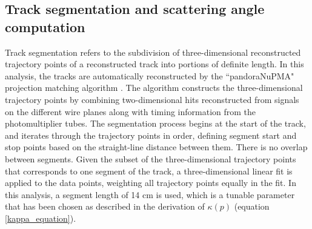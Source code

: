 \documentclass[a4paper,11pt]{article}
\begin{document}
\subsection{Track segmentation and scattering angle computation}\label{track_segmentation_and_scattering_angle_computation_section}

Track segmentation refers to the subdivision of three-dimensional reconstructed trajectory points of a reconstructed track into portions of definite length. In this analysis, the tracks are automatically reconstructed by the ``pandoraNuPMA" projection matching algorithm \cite{Marshall:2015rfa}. The algorithm constructs the three-dimensional trajectory points by combining two-dimensional hits reconstructed from signals on the different wire planes along with timing information from the photomultiplier tubes. The segmentation process begins at the start of the track, and iterates through the trajectory points in order, defining segment start and stop points based on the straight-line distance between them. There is no overlap between segments. Given the subset of the three-dimensional trajectory points that corresponds to one segment of the track, a three-dimensional linear fit is applied to the data points, weighting all trajectory points equally in the fit. In this analysis, a segment length of 14 cm is used, which is a tunable parameter that has been chosen as described in the derivation of $\kappa(p)$ (equation \ref{kappa_equation}).\\
\end{document}
